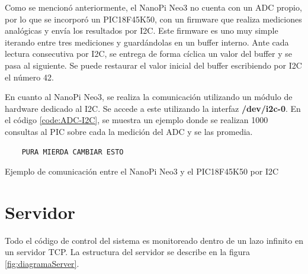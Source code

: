 \documentclass[12pt,letterpaper]{article}     %
\begin{document}
Como se mencionó anteriormente, el NanoPi Neo3 no cuenta con un ADC propio, por lo que se incorporó un 
PIC18F45K50, con un firmware que realiza mediciones analógicas y envía los resultados por I2C.
Este firmware es uno muy simple iterando entre tres mediciones y guardándolas en un buffer interno.
Ante cada lectura consecutiva por I2C, se entrega de forma cíclica un valor del buffer y se pasa al siguiente.
Se puede restaurar el valor inicial del buffer escribiendo por I2C el número 42.

En cuanto al NanoPi Neo3, se realiza la comunicación utilizando un módulo de hardware dedicado al I2C.
Se accede a este utilizando la interfaz \textbf{/dev/i2c-0}. En el código \ref{code:ADC-I2C}, se muestra un
ejemplo donde se realizan 1000 consultas al PIC sobre cada la medición del ADC y se las promedia.

\begin{codigo}[!h]
	\begin{lstlisting}
	PURA MIERDA CAMBIAR ESTO
	\end{lstlisting}
	\caption{Ejemplo de comunicación entre el NanoPi Neo3 y el PIC18F45K50 por I2C}
	\label{code:ADC-I2C}
\end{codigo}

\section{Servidor}

Todo el código de control del sistema es monitoreado dentro de un lazo infinito en un servidor TCP.
La estructura del servidor se describe en la figura \ref{fig:diagramaServer}.
\end{document}
